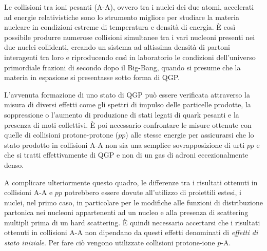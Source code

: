     Le collisioni tra ioni pesanti (A-A), ovvero tra i nuclei dei due atomi, accelerati ad energie relativistiche sono lo strumento migliore per studiare la materia nucleare in condizioni estreme di temperatura e densità di energia. È così possibile produrre numerose collisioni simultanee tra i vari nucleoni presenti nei due nuclei collidenti, creando un sistema ad altissima densità di partoni interagenti tra loro e riproducendo così in laboratorio le condizioni dell'universo primordiale frazioni di secondo dopo il Big-Bang, quando si presume che la materia in espasione si presentasse sotto forma di QGP.

    L'avvenuta formazione di uno stato di QGP può essere verificata attraverso la misura di diversi effetti come gli spettri di impulso delle particelle prodotte, la soppressione o l'aumento di produzione di stati legati di quark pesanti e la presenza di moti collettivi. È poi necessario confrontare le misure ottenute con quelle di collisioni protone-protone ($pp$) alle stesse energie per assicurarsi che lo stato prodotto in collisioni A-A non sia una semplice sovrapposizione di urti $pp$ e che si tratti effettivamente di QGP e non di un gas di adroni eccezionalmente denso.

    A complicare ulteriormente questo quadro, le differenze tra i risultati ottenuti in collisioni A-A e $pp$ potrebbero essere dovute all'utilizzo di proiettili estesi, i nuclei, nel primo caso, in particolare per le modifiche alle funzioni di distribuzione partonica nei nucleoni appartenenti ad un nucleo e alla presenza di scattering multipli prima di un hard scattering. È quindi necessario accertarsi che i risultati ottenuti in collisioni A-A non dipendano da questi effetti denominati di \textit{effetti di stato iniziale}. Per fare ciò vengono utilizzate collisioni protone-ione $p$-A.

